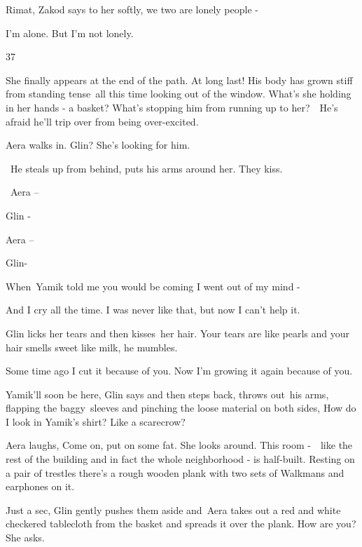 \documentclass[twoside,11pt]{book}
\begin{document}
{\textquotedbl}Rimat,{\textquotedbl} Zakod says to her softly, {\textquotedbl}we two are lonely people -{\textquotedbl}

{\textquotedbl}I'm alone. But I'm not lonely.{\textquotedbl}


\bigskip

37 \ 

She finally appears at the end of the path. At long last! His body has grown stiff from standing
tense{\ }all this time looking out of the window. What's she holding in her
hands - a basket? What's stopping him from running up to her?\ \ He's afraid he'll trip over from being over-excited.\ 

Aera walks in. {\textquotedbl}Glin?{\textquotedbl} She's looking for him.

~He steals up from behind, puts his arms around her. They kiss.

~{\textquotedbl}Aera --{\textquotedbl} 

{\textquotedbl}Glin -{\textquotedbl} 

{\textquotedbl}Aera --{\textquotedbl} 

{\textquotedbl}Glin{\textquotedbl}- 

{\textquotedbl}When\ Yamik told me you would be coming I went out of my mind {}-{\textquotedbl} 

{\textquotedbl}And I cry all the time. I was never like that, but now I can't help it.{\textquotedbl} 

Glin licks her tears and then kisses\ her hair. {\textquotedbl}Your tears are like pearls and your hair smells sweet
like milk,{\textquotedbl} he mumbles.\ 

{\textquotedbl}Some time ago I cut it because of you. Now I'm growing it again because of you.{\textquotedbl} 

{\textquotedbl}Yamik'll soon be here,{\textquotedbl} Glin says and then steps back, throws
out{\ }his arms, flapping the baggy~sleeves and pinching the loose material on
both sides, {\textquotedbl}How do I look in Yamik's shirt? Like a scarecrow? {\textquotedbl} 

Aera laughs, {\textquotedbl}Come on, put on some fat.{\textquotedbl} She looks around. This room -\ \ like the rest of
the building and in fact the whole neighborhood - is half{{}-}built. Resting on
a pair of trestles there's a rough wooden plank with two sets of Walkmans and earphones on it. 

{\textquotedbl}Just a sec,{\textquotedbl} Glin gently pushes them aside and\ Aera takes out a red and white checkered
tablecloth from the basket and spreads it over the plank. {\textquotedbl}How are you?{\textquotedbl} She asks.\ 
\end{document}
